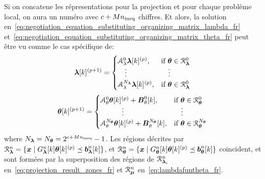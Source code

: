 \documentclass[../main.tex]{subfiles}
\begin{document}
Si on concatene les répresentations pour la projection et pour chaque problème local, on aura un numéro avec $c+Mn_{\text{ineq}}$ chiffres.
Et alors, la solution en~\eqref{eq:negotiation_equation_substituting_organizing_matrix_lambda_fr} et~\eqref{eq:negotiation_equation_substituting_organizing_matrix_theta_fr} peut être vu comme le cas spécifique de:
\begin{equation}
  \label{eq:negotiation_equation_substituting_organizing_matrix_lambda_switched_fr}
  \vec{\lambda}[k]\pplusone=
  \begin{cases}
    \mathcal{A}_{\lambda}^{0}\vec{\lambda}[k]\p,&\text{if}\ \vec{\theta} \in \set{R}_{\vec{\lambda}}^{0}\\
    \quad\vdots&\quad\vdots\\
    \mathcal{A}_{\lambda}^{N_{\vec{\lambda}}}\vec{\lambda}[k]\p,&\text{if}\ \vec{\theta}\in\set{R}_{\vec{\lambda}}^{0}\\
  \end{cases}
\end{equation}
\begin{equation}
  \label{eq:negotiation_equation_substituting_organizing_matrix_theta_switched_fr}
  \vec{\theta}[k]\pplusone=
  \begin{cases}
    \mathcal{A}_{\theta}^{0}\vec{\theta}[k]\p+\mathcal{\vec{B}}_{\theta}^{0}[k],&\text{if}\ \vec{\theta}\in\set{R}_{\vec{\theta}}^{0}\\
    \qquad\quad \vdots&\quad \vdots\\
    \mathcal{A}_{\theta}^{N_{\vec{\theta}}}\vec{\theta}[k]\p+\mathcal{\vec{B}}_{\theta}^{N_{\vec{\theta}}}[k],&\text{if}\ \vec{\theta}\in\set{R}_{\vec{\theta}}^{N_{\vec{\theta}}}\\
  \end{cases}
\end{equation}
where $N_{\boldsymbol{\lambda}}=N_{\boldsymbol{\theta}}=2^{c+Mn_{\text{ineq}}}-1$.
Les régions décrites par ${\mathcal{R}_{\boldsymbol{\lambda}}^{n}=\{\boldsymbol{x}\mid G_{\boldsymbol{\lambda}}^{n}[k]\boldsymbol{\theta}[k]^{(p)} \preceq \boldsymbol{b}_{\boldsymbol{\lambda}}^{n}[k]\}}$, et
 ${\mathcal{R}_{\boldsymbol{\theta}}^{n}=\{\boldsymbol{x}\mid G_{\boldsymbol{\theta}}^{n}[k]\boldsymbol{\theta}[k]^{(p)} \preceq \boldsymbol{b}_{\boldsymbol{\theta}}^{n}[k]\}}$
coincident, et sont formées par la superposition des régions de $\mathcal{R}_{\boldsymbol{\lambda}_{i}}^{n}$ en~\eqref{eq:projection_result_zones_fr} et $\mathcal{R}_{\boldsymbol{\mu}}^{n}$ en~\eqref{eq:lambdafuntheta_fr}.
\end{document}
